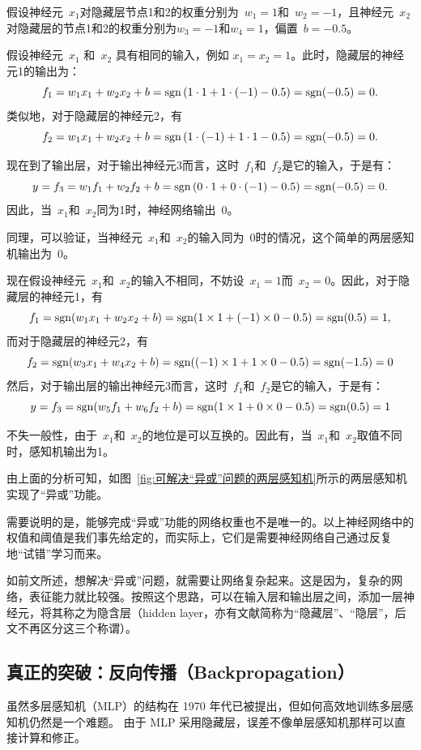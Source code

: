 假设神经元~$x_1$对隐藏层节点1和2的权重分别为~$w_1=1$和~$w_2=-1$，且神经元~$x_2$对隐藏层的节点1和2的权重分别为$w_3=-1$和$w_4=1$，偏置~$b =-0.5$。

假设神经元~$x_1$ 和~$x_2$ 具有相同的输入，例如 $x_1= x_2=1$。此时，隐藏层的神经元1的输出为：
$$
f_1 =w_1 x_1 +w_2x_2 +b =  {\rm sgn}\left( 1 \cdot 1 + 1\cdot (-1) -0.5 \right) =  {\rm sgn}(-0.5) =0.
$$
类似地，对于隐藏层的神经元2，有
$$
f_2 = w_1 x_1 +w_2x_2 +b = {\rm sgn}\left( 1 \cdot (-1) + 1\cdot 1 -0.5\right) =  {\rm sgn}(-0.5) =0.
$$

现在到了输出层，对于输出神经元3而言，这时~$f_1$和~$f_2$是它的输入，于是有：
$$
y = f_3 =w_1 f_1 +w_2f_2 +b =  {\rm sgn}\left( 0 \cdot 1 + 0\cdot (-1) -0.5\right) =  {\rm sgn}(-0.5) =0.
$$
因此，当~$x_1$和~$x_2$同为1时，神经网络输出~$0$。

同理，可以验证，当神经元~$x_1$和~$x_2$的输入同为~$0$时的情况，这个简单的两层感知机输出为~$0$。

现在假设神经元~$x_1$和~$x_2$的输入不相同，不妨设~$x_1=1$而~$x_2=0$。因此，对于隐藏层的神经元1，有
$$
f_1 ={\rm sgn}(w_1x_1 + w_2x_2 +b) ={\rm sgn}(1\times 1 +(-1)\times 0-0.5) ={\rm sgn}(0.5) =1,
$$
而对于隐藏层的神经元2，有
$$
f_2 ={\rm sgn}(w_3x_1 + w_4x_2 +b) ={\rm sgn}( (-1)\times1 +1\times 0-0.5) ={\rm sgn}(-1.5) =0
$$
然后，对于输出层的输出神经元3而言，这时~$f_1$和~$f_2$是它的输入，于是有：
$$
y=f_3 ={\rm sgn}(w_5f_1 + w_6f_2 +b) ={\rm sgn}(1\times 1 +0\times 0-0.5) ={\rm sgn}(0.5) =1
$$

不失一般性，由于~$x_1$和~$x_2$的地位是可以互换的。因此有，当~$x_1$和~$x_2$取值不同时，感知机输出为1。

由上面的分析可知，如图~\ref{fig:可解决“异或”问题的两层感知机}所示的两层感知机实现了“异或”功能。

需要说明的是，能够完成“异或”功能的网络权重也不是唯一的。以上神经网络中的权值和阈值是我们事先给定的，而实际上，它们是需要神经网络自己通过反复地“试错”学习而来。

如前文所述，想解决“异或”问题，就需要让网络复杂起来。这是因为，复杂的网络，表征能力就比较强。按照这个思路，可以在输入层和输出层之间，添加一层神经元，将其称之为隐含层（hidden layer，亦有文献简称为“隐藏层”、“隐层”，后文不再区分这三个称谓）。

\subsection{真正的突破：反向传播（Backpropagation）}
虽然多层感知机（MLP）的结构在 1970 年代已被提出，但如何高效地训练多层感知机仍然是一个难题。
由于 MLP 采用隐藏层，误差不像单层感知机那样可以直接计算和修正。%

